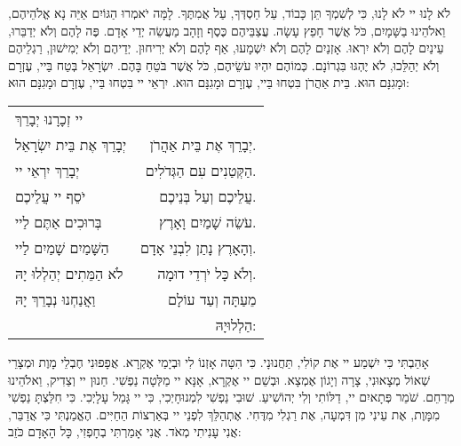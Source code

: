 {\glossfont
{\small

לֹא לָנוּ יי לֹא לָנוּ, כִּי לְשִׁמְךָ תֵּן כָּבוֹד, עַל חַסְדְּךָ, עַל אֲמִתֶּךָ. 
לָמָּה יֹאמְרוּ הַגּוֹיִם אַיֵּה נָא אֱלֹהֵיהֶם, וֵאלֹהֵינוּ בַשָּׁמָיִם, כֹּל אֲשֶׁר חָפֵץ עָשָׂה. 
עֲצַבֵּיהֶם כֶּסֶף וְזָהָב מַעֲשֵׂה יְדֵי אָדָם. פֶּה לָהֶם וְלֹא יְדַבֵּרוּ, עֵינַיִם לָהֶם וְלֹא יִרְאוּ. 
אָזְנַיִם לָהֶם וְלֹא יִשְׁמָעוּ, אַף לָהֶם וְלֹא יְרִיחוּן. 
יְדֵיהֶם וְלֹא יְמִישׁוּן, רַגְלֵיהֶם וְלֹא יְהַלֵּכוּ, לֹא יֶהְגּוּ בִּגְרוֹנָם. 
כְּמוֹהֶם יִהְיוּ עֹשֵׂיהֶם, כֹּל אֲשֶׁר בֹּטֵחַ בָּהֶם. יִשְׂרָאֵל בְּטַח בַּיי, עֶזְרָם וּמָגִנָּם הוּא. 
בֵּית אַהֲרֹן בִּטְחוּ בַּיי, עֶזְרָם וּמָגִנָּם הוּא. יִרְאֵי יי בִּטְחוּ בַּיי, עֶזְרָם וּמָגִנָּם הוּא:
}
\vspace{1em}

\begin{center}
\begin{tabular}{l r}
יי זְכָרָנוּ יְבָרֵךְ \\
יְבָרֵךְ אֶת בֵּית יִשְׂרָאֵל &
יְבָרֵךְ אֶת בֵּית אַהֲרֹן. \\ 
יְבָרֵךְ יִרְאֵי יי &
הַקְּטַנִים עִם הַגְּדֹלִים. \\
יֹסֵף יי עֲלֵיכֶם &
עֲלֵיכֶם וְעַל בְּנֵיכֶם. \\
בְּרוּכִים אַתֶּם לַיי &
עֹשֵׂה שָׁמַיִם וָאָרֶץ. \\
הַשָּׁמַיִם שָׁמַיִם לַיי &
וְהָאָרֶץ נָתַן לִבְנֵי אָדָם. \\
לֹא הַמֵּתִים יְהַלְלוּ יָהּ &
וְלֹא כָּל יֹרְדֵי דוּמָה. \\
וַאֲנַחְנוּ נְבָרֵךְ יָהּ &
מֵעַתָּה וְעַד עוֹלָם \\
& הַלְלוּיָהּ: \\
\end{tabular}
\end{center}

\vspace{1em}

{\small
אָהַבְתִּי כִּי יִשְׁמַע יי אֶת קוֹלִי, תַּחֲנוּנָי. 
כִּי הִטָּה אָזְנוֹ לִי וּבְיָמַי אֶקְרָא. 
אֲפָפוּנִי חֶבְלֵי מָוֶת וּמְצָרֵי שְׁאוֹל מְצָאוּנִי, צָרָה וְיָגוֹן אֶמְצָא. 
וּבְשֵׁם יי אֶקְרָא, אָנָּא יי מַלְּטָה נַפְשִׁי. חַנוּן יי וְצַדִיק, וֵאלֹהֵינוּ מְרַחֵם. 
שֹׁמֵר פְּתָאיִם יי, דַלּוֹתִי וְלִי יְהוֹשִׁיעַ. 
שׁוּבִי נַפְשִׁי לִמְנוּחָיְכִי, כִּי יי גָּמַל עָלָיְכִי. 
כִּי חִלַּצְתָּ נַפְשִׁי מִמָּוֶת, אֶת עֵינִי מִן דִּמְעָה, אֶת רַגְלִי מִדֶּחִי. 
אֶתְהַלֵּךְ לִפְנֵי יי בְּאַרְצוֹת הַחַיִּים. הֶאֱמַנְתִּי כִּי אֲדַבֵּר, אֲנִי עָנִיתִי מְאֹד. 
אֲנִי אָמַרְתִּי בְחָפְזִי, כָּל הָאָדָם כֹּזֵב:
}

}
